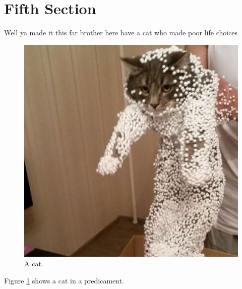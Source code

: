 \documentclass{article}
\begin{document}
\section{Fifth Section}
Well ya made it this far brother here have a cat who made poor life choices

\begin{figure}[!htb]
	\includegraphics[width=\linewidth]{Images/mistake.jpg}
	\caption{A cat.}
  	\label{fig:cat}
\end{figure}

Figure \ref{fig:cat} shows a cat in a predicament.
\end{document}
